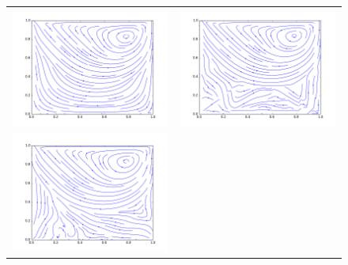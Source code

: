 \begin{figure}
\begin{tabulary}{\linewidth}{c c}
		\\
		\includegraphics[width=\figwid]{figs/lid/bingham_100_svec-8_Bn10_Re1000/sl_step-000036192}
		&
		\includegraphics[width=\figwid]{figs/lid/bingham_100_bgk-filter_Bn10_Re1000/sl_step-000050000}
		\\
		\includegraphics[width=\figwid]{figs/lid/bingham_100_mrt-8_Bn10_Re1000/sl_step-000050000}

\end{tabulary}
\end{figure}
